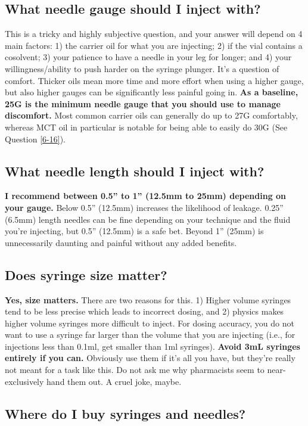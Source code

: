\documentclass{article}
\begin{document}
\subsection{What needle gauge should I inject with?}\label{5-16}

This is a tricky and highly subjective question, and your answer will depend on 4 main factors: 1) the carrier oil for what you are injecting; 2) if the vial contains a cosolvent; 3) your patience to have a needle in your leg for longer; and 4) your willingness/ability to push harder on the syringe plunger. It’s a question of comfort. Thicker oils mean more time and more effort when using a higher gauge, but also higher gauges can be significantly less painful going in. \textbf{As a baseline, 25G is the minimum needle gauge that you should use to manage discomfort. }Most common carrier oils can generally do up to 27G comfortably, whereas MCT oil in particular is notable for being able to easily do 30G (See Question \ref{6-16}).

\subsection{What needle length should I inject with?}

\textbf{I recommend between 0.5” to 1” (12.5mm to 25mm) depending on your gauge.} Below 0.5” (12.5mm) increases the likelihood of leakage. 0.25” (6.5mm) length needles can be fine depending on your technique and the fluid you’re injecting, but 0.5” (12.5mm) is a safe bet. Beyond 1” (25mm) is unnecessarily daunting and painful without any added benefits.

\subsection{Does syringe size matter?}

\textbf{Yes, size matters.} There are two reasons for this. 1) Higher volume syringes tend to be less precise which leads to incorrect dosing, and 2) physics makes higher volume syringes more difficult to inject. For dosing accuracy, you do not want to use a syringe far larger than the volume that you are injecting (i.e., for injections less than 0.1ml, get smaller than 1ml syringes). \textbf{Avoid 3mL syringes entirely if you can.} Obviously use them if it’s all you have, but they’re really not meant for a task like this. Do not ask me why pharmacists seem to near-exclusively hand them out. A cruel joke, maybe.

\subsection{Where do I buy syringes and needles?}
\end{document}
